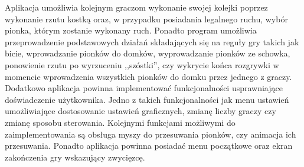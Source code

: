 \documentclass[conference]{IEEEtran}
\begin{document}
Aplikacja umożliwia kolejnym graczom wykonanie swojej kolejki poprzez wykonanie rzutu kostką oraz, w przypadku posiadania legalnego ruchu, wybór pionka, którym zostanie wykonany ruch.  Ponadto program umożliwia przeprowadzenie podstawowych działań składających się na reguły gry takich jak bicie, wprowadzanie pionków do domków, wyprowadzanie pionków ze schowka, ponowienie rzutu po wyrzuceniu ,,szóstki'', czy wykrycie końca rozgrywki w momencie wprowadzenia wszystkich pionków do domku przez jednego z graczy. Dodatkowo aplikacja powinna implementować funkcjonalności usprawniające doświadczenie użytkownika. Jedno z takich funkcjonalności jak menu ustawień umożliwiające dostosowanie ustawień graficznych, zmianę liczby graczy czy zmianę sposobu sterowania. Kolejnymi funkcjami możliwymi do zaimplementowania są obsługa myszy do przesuwania pionków, czy animacja ich przesuwania. Ponadto aplikacja powinna posiadać menu początkowe oraz ekran zakończenia gry wskazujący zwycięzcę.
\end{document}
